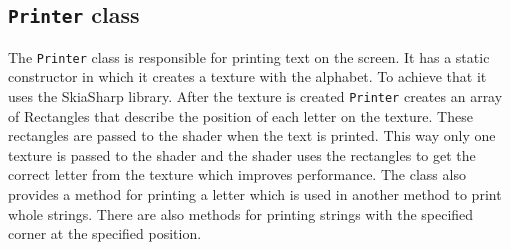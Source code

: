 \subsection{\texttt{Printer} class}

The \texttt{Printer} class is responsible for printing text on the screen.
It has a static constructor in which it creates a texture with the alphabet.
To achieve that it uses the SkiaSharp library.
After the texture is created \texttt{Printer} creates an array of Rectangles that describe the position of each letter on the texture.
These rectangles are passed to the shader when the text is printed.
This way only one texture is passed to the shader and the shader uses the rectangles to get the correct letter from the texture which improves performance.
The class also provides a method for printing a letter which is used in another method to print whole strings.
There are also methods for printing strings with the specified corner at the specified position.